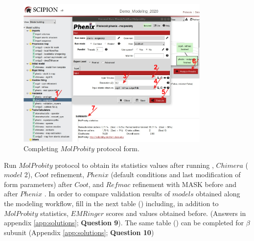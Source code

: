 \begin{itemize}
 \begin{figure}[H]
  \centering 
  \captionsetup{width=.7\linewidth} 
  \includegraphics[width=0.85\textwidth]{Images/Fig35}
  \caption{Completing $MolProbity$ protocol form.}
  \label{fig:molprobity_protocol}
  \end{figure}
  
  Run $MolProbity$ protocol to obtain its statistics values after running , $Chimera$  ($model$ 2), $Coot$ refinement, $Phenix$  (default conditions and last modification of form parameters) after $Coot$, and $Refmac$ refinement with MASK before and after $Phenix$ . In order to compare validation results of $models$ obtained along the modeling workflow, fill in the next table () including, in addition to $MolProbity$ statistics, $EMRinger$ scores and \ccmask values obtained before. (Answers in appendix \ref{app:solutions}; \textbf{Question 9}). The same table () can be completed for  $\beta$ subunit (Appendix \ref{app:solutions}; \textbf{Question 10})\\
  

\end{itemize}
